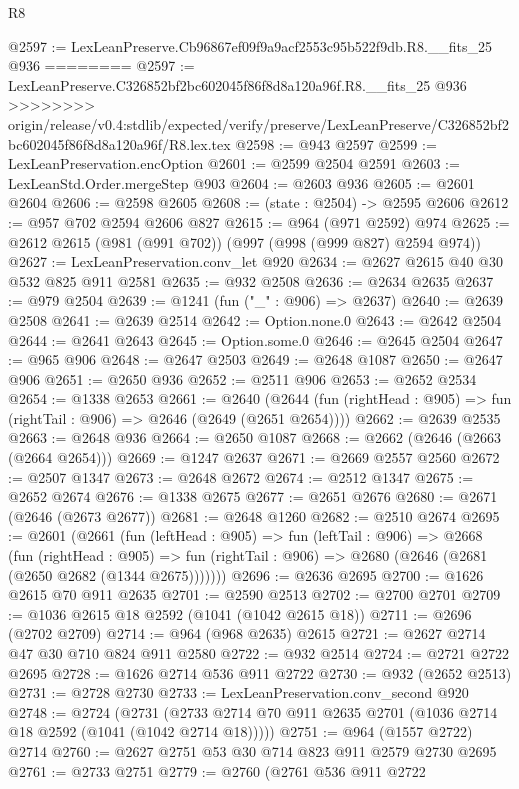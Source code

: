 \begin{lexlean}{R8}
\begin{coremodule}
{{{{{{{{{{{{{{{{{{{{{{{{{{{{{{{{{{{{{{{{{{{{{@2597 := LexLeanPreserve.Cb96867ef09f9a9acf2553c95b522f9db.R8.__fits_25 @936
========
@2597 := LexLeanPreserve.C326852bf2bc602045f86f8d8a120a96f.R8.__fits_25 @936
>>>>>>>> origin/release/v0.4:stdlib/expected/verify/preserve/LexLeanPreserve/C326852bf2bc602045f86f8d8a120a96f/R8.lex.tex
@2598 := @943 @2597
@2599 := LexLeanPreservation.encOption
@2601 := @2599 @2504 @2591
@2603 := LexLeanStd.Order.mergeStep @903
@2604 := @2603 @936
@2605 := @2601 @2604
@2606 := @2598 @2605
@2608 := (state : @2504) -> @2595 @2606
@2612 := @957 @702 @2594 @2606 @827
@2615 := @964 (@971 @2592) @974
@2625 := @2612 @2615 (@981 (@991 @702)) (@997 (@998 (@999 @827) @2594 @974))
@2627 := LexLeanPreservation.conv_let @920
@2634 := @2627 @2615 @40 @30 @532 @825 @911 @2581
@2635 := @932 @2508
@2636 := @2634 @2635
@2637 := @979 @2504
@2639 := @1241 (fun ("_" : @906) => @2637)
@2640 := @2639 @2508
@2641 := @2639 @2514
@2642 := Option.none.{0}
@2643 := @2642 @2504
@2644 := @2641 @2643
@2645 := Option.some.{0}
@2646 := @2645 @2504
@2647 := @965 @906
@2648 := @2647 @2503
@2649 := @2648 @1087
@2650 := @2647 @906
@2651 := @2650 @936
@2652 := @2511 @906
@2653 := @2652 @2534
@2654 := @1338 @2653
@2661 := @2640
    (@2644 (fun (rightHead : @905) => fun (rightTail : @906) => @2646 (@2649 (@2651 @2654))))
@2662 := @2639 @2535
@2663 := @2648 @936
@2664 := @2650 @1087
@2668 := @2662 (@2646 (@2663 (@2664 @2654)))
@2669 := @1247 @2637
@2671 := @2669 @2557 @2560
@2672 := @2507 @1347
@2673 := @2648 @2672
@2674 := @2512 @1347
@2675 := @2652 @2674
@2676 := @1338 @2675
@2677 := @2651 @2676
@2680 := @2671 (@2646 (@2673 @2677))
@2681 := @2648 @1260
@2682 := @2510 @2674
@2695 := @2601
    (@2661
      (fun (leftHead : @905) =>
      fun (leftTail : @906) =>
      @2668
        (fun (rightHead : @905) =>
        fun (rightTail : @906) => @2680 (@2646 (@2681 (@2650 @2682 (@1344 @2675)))))))
@2696 := @2636 @2695
@2700 := @1626 @2615 @70 @911 @2635
@2701 := @2590 @2513
@2702 := @2700 @2701
@2709 := @1036 @2615 @18 @2592 (@1041 (@1042 @2615 @18))
@2711 := @2696 (@2702 @2709)
@2714 := @964 (@968 @2635) @2615
@2721 := @2627 @2714 @47 @30 @710 @824 @911 @2580
@2722 := @932 @2514
@2724 := @2721 @2722 @2695
@2728 := @1626 @2714 @536 @911 @2722
@2730 := @932 (@2652 @2513)
@2731 := @2728 @2730
@2733 := LexLeanPreservation.conv_second @920
@2748 := @2724
    (@2731 (@2733 @2714 @70 @911 @2635 @2701 (@1036 @2714 @18 @2592 (@1041 (@1042 @2714 @18)))))
@2751 := @964 (@1557 @2722) @2714
@2760 := @2627 @2751 @53 @30 @714 @823 @911 @2579 @2730 @2695
@2761 := @2733 @2751
@2779 := @2760
    (@2761
      @536
      @911
      @2722
}}}}}}}}}}}}}}}}}}}}}}}}}}}}}}}}}}}}}}}}}}}}}
\end{coremodule}
\end{lexlean}
